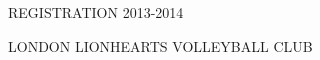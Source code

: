 % 
% 
% 
% 
% 
% 
%
\usepackage{graphicx}
\usepackage{lmodern}
\usepackage{multirow}
\usepackage{wasysym}
\usepackage[cm]{fullpage}
\usepackage[T1]{fontenc}
\setlength{\textheight}{800pt}
\usepackage{ulem}
\usepackage{etoolbox}
\usepackage[british]{babel}

\graphicspath{{\datapath/} {\gpath/}}

\sffamily
\thispagestyle{empty}
\begin{center}


REGISTRATION 2013-2014

LONDON LIONHEARTS VOLLEYBALL CLUB

\end{center}

